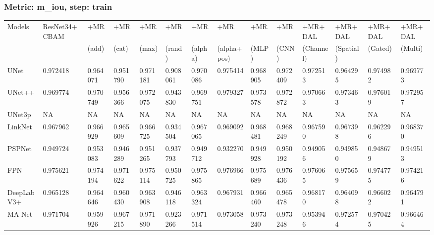 \documentclass{article}
\begin{document}
\subsubsection{Metric: m\_iou, step: train}
\begin{tabular}{llllllllllllll}
\toprule
Models & ResNet34+CBAM & +MR  & +MR  & +MR  & +MR  & +MR  & +MR  & +MR  & +MR  & +MR+DAL & +MR+DAL & +MR+DAL & +MR+DAL \\
       &             &  (add) &  (cat) &  (max) &  (rand) &  (alpha) &  (alpha+pos) &  (MLP) &  (CNN) & (Channel) & (Spatial) & (Gated) & (Multi) \\
\midrule
UNet & 0.972418 & 0.964071 & 0.951790 & 0.971181 & 0.908061 & 0.970086 & 0.975414 & 0.968905 & 0.972409 & 0.972513 & 0.964295 & 0.974982 & 0.969773 \\
UNet++ & 0.969774 & 0.970749 & 0.956366 & 0.972075 & 0.943830 & 0.969751 & 0.979327 & 0.973578 & 0.972872 & 0.970663 & 0.973463 & 0.976019 & 0.972957 \\
UNet3p & NA & NA & NA & NA & NA & NA & NA & NA & NA & NA & NA & NA & NA \\
LinkNet & 0.967962 & 0.966929 & 0.965609 & 0.966725 & 0.934504 & 0.967065 & 0.969092 & 0.968481 & 0.968249 & 0.967590 & 0.967398 & 0.962296 & 0.968370 \\
PSPNet & 0.949724 & 0.953083 & 0.946289 & 0.951265 & 0.937793 & 0.949712 & 0.932270 & 0.949928 & 0.950192 & 0.949056 & 0.949850 & 0.948679 & 0.949513 \\
FPN & 0.975621 & 0.974194 & 0.971622 & 0.975114 & 0.950725 & 0.975865 & 0.976966 & 0.975689 & 0.976436 & 0.976065 & 0.975659 & 0.974775 & 0.974216 \\
DeepLabV3+ & 0.965128 & 0.964646 & 0.960430 & 0.963908 & 0.946118 & 0.963324 & 0.967931 & 0.966460 & 0.965478 & 0.968170 & 0.964098 & 0.966022 & 0.964791 \\
MA-Net & 0.971704 & 0.959926 & 0.967215 & 0.971890 & 0.923266 & 0.971514 & 0.973058 & 0.973240 & 0.973248 & 0.953946 & 0.972574 & 0.970425 & 0.966464 \\
\bottomrule
\end{tabular}
\end{document}
